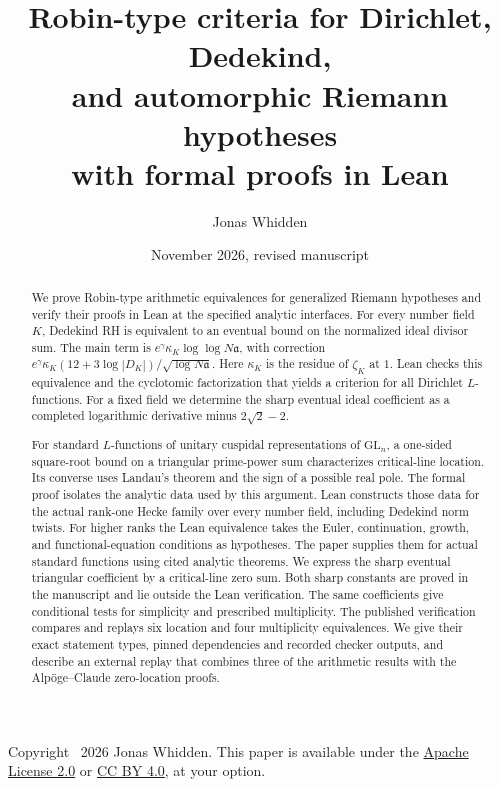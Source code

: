 \documentclass[11pt]{amsart}
\title[Robin-type criteria with Lean proofs]
      {Robin-type criteria for Dirichlet, Dedekind,\\
       and automorphic Riemann hypotheses\\
       with formal proofs in Lean}
\author{Jonas Whidden}
\date{November 2026, revised manuscript}
\theoremstyle{definition}
\theoremstyle{remark}
\numberwithin{equation}{section}
\begin{document}
\setlength{\emergencystretch}{2em}
\raggedbottom
\begin{abstract}
We prove Robin-type arithmetic equivalences for generalized
Riemann hypotheses and verify their proofs in Lean at the
specified analytic interfaces. For every number field \(K\),
Dedekind RH is equivalent to an eventual bound on the normalized
ideal divisor sum. The main term is
\(e^\gamma\kappa_K\log\log N\mathfrak a\), with correction
\(e^\gamma\kappa_K(12+3\log|D_K|)/\sqrt{\log N\mathfrak a}\).
Here \(\kappa_K\) is the residue of \(\zeta_K\) at \(1\).
Lean checks this equivalence and the cyclotomic factorization
that yields a criterion for all Dirichlet \(L\)-functions.
For a fixed field we determine the sharp eventual ideal
coefficient as a completed logarithmic derivative minus
\(2\sqrt2-2\).

For standard \(L\)-functions of unitary cuspidal representations
of \(\mathrm{GL}_n\), a one-sided square-root bound on a triangular
prime-power sum characterizes critical-line location. Its converse
uses Landau's theorem and the sign of a possible real pole.
The formal proof isolates the analytic data used by this argument.
Lean constructs those data for the actual rank-one Hecke family over
every number field, including Dedekind norm twists. For higher
ranks the Lean equivalence takes the Euler, continuation, growth,
and functional-equation conditions as hypotheses. The paper supplies
them for actual standard functions using cited analytic theorems.
We express the sharp eventual triangular coefficient by a
critical-line zero sum. Both sharp constants are proved in the
manuscript and lie outside the Lean verification.
The same coefficients give conditional tests for
simplicity and prescribed multiplicity. The published verification
compares and replays six location and four multiplicity
equivalences. We give their exact statement types, pinned
dependencies and recorded checker outputs, and describe an
external replay that combines three of the arithmetic results with
the Alp\"oge--Claude zero-location proofs.
\end{abstract}
\maketitle

\begin{center}
\small
Copyright \textcopyright\ 2026 Jonas Whidden. This paper is available under
the \href{https://www.apache.org/licenses/LICENSE-2.0}{Apache License 2.0} or
\href{https://creativecommons.org/licenses/by/4.0/}{CC BY 4.0}, at your option.
\end{center}
\end{document}
